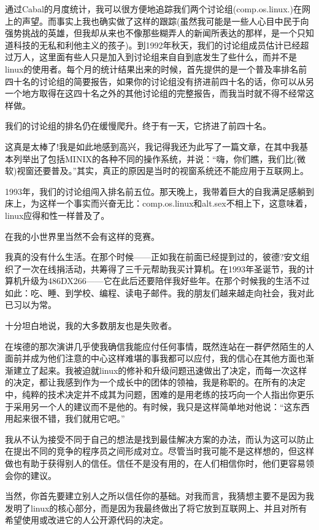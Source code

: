 通过Cabal的月度统计，我可以很方便地追踪我们两个讨论组(comp.os.linux.)在网上的声望。而事实上我也确实做了这样的跟踪(虽然我可能是一些人心目中民于向强势挑战的英雄，但我却从来也不像那些糊弄人的新闻所表达的那样，是一个只知道科技的无私和利他主义的孩子)。到1992年秋天，我们的讨论组成员估计已经超过万人，这里面有些人只是加入到讨论组来自自到底发生了些什么，而并不是linux的使用者。每个月的统计结果出来的时候，首先提供的是一个普及率排名前四十名的讨论组的简要报告，如果你的讨论组没有挤进前四十名的话，你可以从另一个地方取得在这四十名之外的其他讨论组的完整报告，而我当时就不得不经常这样做。

我们的讨论组的排名仍在缓慢爬升。终于有一天，它挤进了前四十名。

这真是太棒了!我是如此地感到高兴，我记得我还为此写了一篇文章，在其中我基本列举出了包括MINIX的各种不同的操作系统，并说：“嗨，你们瞧，我们比(微软)视窗还要普及。”其实，真正的原因是当时的视窗系统还不能应用于互联网上。

1993年，我们的讨论组闯入排名前五位。那天晚上，我带着巨大的自我满足感躺到床上，为这样一个事实而兴奋无比：comp.os.linux和alt.sex不相上下，这意味着，linux应得和性一样普及了。

 

在我的小世界里当然不会有这样的竞赛。

我真的没有什么生活。在那个时候——正如我在前面已经提到过的，彼德?安文组织了一次在线捐活动，共筹得了三千元帮助我买计算机。在1993年圣诞节，我的计算机升级为486DX266——它在此后还要陪伴我好些年。在那个时候我的生活不过如此：吃、睡、到学校、编程、读电子邮件。我的朋友们越来越走向社会，我对此已习以为常。

十分坦白地说，我的大多数朋友也是失败者。

在埃德的那次演讲几乎使我确信我能应付任何事情，既然连站在一群俨然陌生的人面前并成为他们注意的中心这样难堪的事我都可以应付，我的信心在其他方面也渐渐建立了起来。我被迫就linux的修补和升级问题迅速做出了决定，而每一次这样的决定，都让我感到作为一个成长中的团体的领袖，我是称职的。在所有的决定中，纯粹的技术决定并不成其为问题，困难的是用老练的技巧向一个人指出你更乐于采用另一个人的建议而不是他的。有时候，我只是这样简单地对他说：“这东西用起来很不错，我们就用它吧。”

我从不认为接受不同于自己的想法是找到最佳解决方案的办法，而认为这可以防止在提出不同的竞争的程序员之间形成对立。尽管当时我可能不是这样想的，但这样做也有助于获得别人的信任。信任不是没有用的，在人们相信你时，他们更容易领会你的建议。

当然，你首先要建立别人之所以信任你的基础。对我而言，我猜想主要不是因为我发明了linux的核心部分，而是因为我最终做出了将它放到互联网上、并且对所有希望使用或改进它的人公开源代码的决定。

